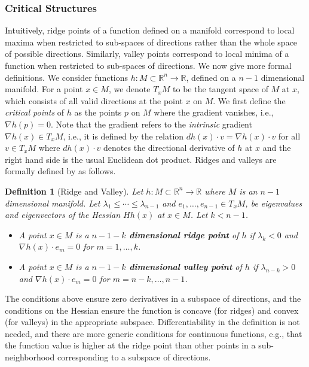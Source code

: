\documentclass[10pt,journal,compsoc]{IEEEtran}
\newcommand{\R}{\mathbb{R}}
\newtheorem{defn}{Definition}
\begin{document}
\subsubsection{Critical Structures}
Intuitively, ridge points of a function defined on a manifold
correspond to local maxima when restricted to sub-spaces of directions
rather than the whole space of possible directions. Similarly, valley
points correspond to local minima of a function when restricted to
sub-spaces of directions. We now give more formal definitions.  We
consider functions $h : M \subset \R^n \to \R$, defined on a $n-1$
dimensional manifold. For a point $x\in M$, we denote $T_x M$ to be
the tangent space of $M$ at $x$, which consists of all valid
directions at the point $x$ on $M$. We first define the \emph{critical
  points} of $h$ as the points $p$ on $M$ where the gradient vanishes,
i.e., $\nabla h(p) = 0$. Note that the gradient refers to the
\emph{intrinsic} gradient $\nabla h(x)\in T_x M$, i.e., it is defined
by the relation $d h(x)\cdot v = \nabla h(x) \cdot v$ for all
$v\in T_xM$ where $d h(x)\cdot v$ denotes the directional derivative
of $h$ at $x$ and the right hand side is the usual Euclidean dot
product. Ridges and valleys are formally defined by
\cite{eberly1994ridges} as follows.
 
\begin{defn}[Ridge and Valley] \label{defn:ridge}
  Let $h : M \subset \R^n\to \R$ where $M$ is an $n-1$ dimensional
  manifold. Let $\lambda_1 \leq \cdots \leq \lambda_{n-1}$ and
  $e_1, \ldots, e_{n-1} \in T_x M$, be eigenvalues and eigenvectors of
  the Hessian $Hh(x)$ at $x\in M$. Let $k<n-1$.
  \begin{itemize}
  \item A point $x\in M$ is a {\bf $n-1-k$ dimensional ridge
      point} of $h$ if $\lambda_{k} < 0$ and $\nabla h(x) \cdot
    e_m = 0$ for $m=1,\ldots, k$.
  \item A point $x\in M$ is a {\bf $n-1-k$ dimensional valley
      point}  of $h$ if $\lambda_{n-k} > 0$ and $\nabla h(x) \cdot
    e_m = 0$ for $m=n-k,\ldots, n-1$.
  \end{itemize}
\end{defn}

The conditions above ensure zero derivatives in a subspace of
directions, and the conditions on the Hessian ensure the function is
concave (for ridges) and convex (for valleys) in the appropriate
subspace. Differentiability in the definition is not needed, and there
are more generic conditions for continuous functions, e.g., that the
function value is higher at the ridge point than other points in a
sub-neighborhood corresponding to a subspace of directions.
\end{document}

